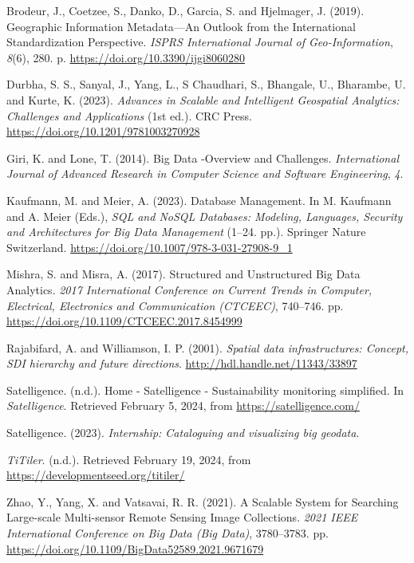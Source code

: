 \documentclass[
  oneside,
  open=any]{scrbook}
\newlength{\cslhangindent}
\newenvironment{CSLReferences}[2] %
 {\begin{list}{}{%
  \setlength{\itemindent}{0pt}
  \setlength{\leftmargin}{0pt}
  \setlength{\parsep}{0pt}
  \ifodd #1
   \setlength{\leftmargin}{\cslhangindent}
   \setlength{\itemindent}{-1\cslhangindent}
  \fi
  \setlength{\itemsep}{#2\baselineskip}}}
 {\end{list}}
\begin{document}
\begin{CSLReferences}{1}{0}
Brodeur, J., Coetzee, S., Danko, D., Garcia, S. and Hjelmager, J.
(2019). Geographic {Information} {Metadata}---{An} {Outlook} from the
{International} {Standardization} {Perspective}. \emph{ISPRS
International Journal of Geo-Information}, \emph{8}(6), 280. p.
\url{https://doi.org/10.3390/ijgi8060280}

Durbha, S. S., Sanyal, J., Yang, L., S Chaudhari, S., Bhangale, U.,
Bharambe, U. and Kurte, K. (2023). \emph{Advances in {Scalable} and
{Intelligent} {Geospatial} {Analytics}: {Challenges} and {Applications}}
(1st ed.). CRC Press. \url{https://doi.org/10.1201/9781003270928}

Giri, K. and Lone, T. (2014). Big {Data} -{Overview} and {Challenges}.
\emph{International Journal of Advanced Research in Computer Science and
Software Engineering}, \emph{4}.

Kaufmann, M. and Meier, A. (2023). Database {Management}. In M. Kaufmann
and A. Meier (Eds.), \emph{{SQL} and {NoSQL} {Databases}: {Modeling},
{Languages}, {Security} and {Architectures} for {Big} {Data}
{Management}} (1--24. pp.). Springer Nature Switzerland.
\url{https://doi.org/10.1007/978-3-031-27908-9_1}

Mishra, S. and Misra, A. (2017). Structured and {Unstructured} {Big}
{Data} {Analytics}. \emph{2017 {International} {Conference} on {Current}
{Trends} in {Computer}, {Electrical}, {Electronics} and {Communication}
({CTCEEC})}, 740--746. pp.
\url{https://doi.org/10.1109/CTCEEC.2017.8454999}

Rajabifard, A. and Williamson, I. P. (2001). \emph{Spatial data
infrastructures: Concept, {SDI} hierarchy and future directions}.
\url{http://hdl.handle.net/11343/33897}

Satelligence. (n.d.). Home - {Satelligence} - {Sustainability}
monitoring simplified. In \emph{Satelligence}. Retrieved February 5,
2024, from \url{https://satelligence.com/}

Satelligence. (2023). \emph{Internship: {Cataloguing} and visualizing
big geodata}.

\emph{{TiTiler}}. (n.d.). Retrieved February 19, 2024, from
\url{https://developmentseed.org/titiler/}

Zhao, Y., Yang, X. and Vatsavai, R. R. (2021). A {Scalable} {System} for
{Searching} {Large}-scale {Multi}-sensor {Remote} {Sensing} {Image}
{Collections}. \emph{2021 {IEEE} {International} {Conference} on {Big}
{Data} ({Big} {Data})}, 3780--3783. pp.
\url{https://doi.org/10.1109/BigData52589.2021.9671679}

\end{CSLReferences}


\backmatter
\end{document}
